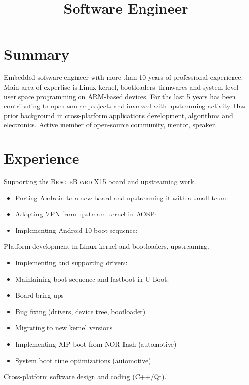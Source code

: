 \documentclass[11pt,a4paper]{moderncv}
\title{Software Engineer}
\begin{document}
\renewcommand*{\bibliographyhead}[1]{}

\maketitle

\section{Summary}

Embedded software engineer with more than 10 years of professional experience.
Main area of expertise is Linux kernel, bootloaders, firmwares and system level
user space programming on ARM-based devices. For the last 5 years has been
contributing to open-source projects and involved with upstreaming activity.
Has prior background in cross-platform applications development, algorithms and
electronics. Active member of open-source community, mentor, speaker.

\section{Experience}
  {Supporting the \textsc{BeagleBoard X15} board and upstreaming work.
   \begin{itemize}
     \item Porting Android to a new board and upstreaming it with a small team:
           \cite{a}
     \item Adopting VPN from upstream kernel in AOSP: \cite{b}
     \item Implementing Android 10 boot sequence: \cite{c}
   \end{itemize}}
  {Platform development in Linux kernel and bootloaders, upstreaming.
   \begin{itemize}
     \item Implementing and supporting drivers: \cite{d}
     \item Maintaining boot sequence and fastboot in U-Boot: \cite{e}
     \item Board bring ups
     \item Bug fixing (drivers, device tree, bootloader)
     \item Migrating to new kernel versions
     \item Implementing XIP boot from NOR flash (automotive)
     \item System boot time optimizations (automotive)
   \end{itemize}
  }
  {Cross-platform software design and coding (C++/Qt).}
\end{document}
